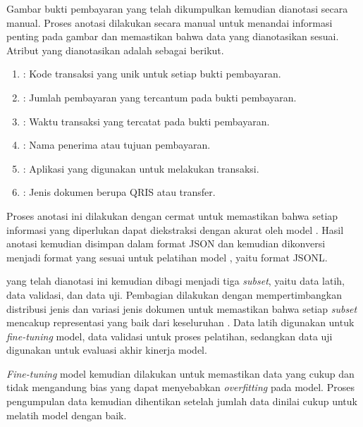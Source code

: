 Gambar bukti pembayaran yang telah dikumpulkan kemudian dianotasi secara manual. Proses anotasi dilakukan secara manual untuk menandai informasi penting pada gambar dan memastikan bahwa data yang dianotasikan sesuai. Atribut yang dianotasikan adalah sebagai berikut.
\begin{enumerate}
    \item \iden{}: Kode transaksi yang unik untuk setiap bukti pembayaran.
    \item \total{}: Jumlah pembayaran yang tercantum pada bukti pembayaran.
    \item \ttime{}: Waktu transaksi yang tercatat pada bukti pembayaran.
    \item \target{}: Nama penerima atau tujuan pembayaran.
    \item \app{}: Aplikasi yang digunakan untuk melakukan transaksi.
    \item \type{}: Jenis dokumen berupa QRIS atau transfer.
\end{enumerate}

Proses anotasi ini dilakukan dengan cermat untuk memastikan bahwa setiap informasi yang diperlukan dapat diekstraksi dengan akurat oleh model \donut{}. Hasil anotasi kemudian disimpan dalam format JSON dan kemudian dikonversi menjadi format yang sesuai untuk pelatihan model \donut{}, yaitu format JSONL. 

\datasetfl{} yang telah dianotasi ini kemudian dibagi menjadi tiga \emph{subset}, yaitu data latih, data validasi, dan data uji. Pembagian dilakukan dengan mempertimbangkan distribusi jenis dan variasi jenis dokumen untuk memastikan bahwa setiap \emph{subset} mencakup representasi yang baik dari keseluruhan \dataset. Data latih digunakan untuk \emph{fine-tuning} model, data validasi untuk proses pelatihan, sedangkan data uji digunakan untuk evaluasi akhir kinerja model. 

\emph{Fine-tuning} model kemudian dilakukan untuk memastikan data yang cukup dan tidak mengandung bias yang dapat menyebabkan \emph{overfitting} pada model. Proses pengumpulan data kemudian dihentikan setelah jumlah data dinilai cukup untuk melatih model \donut{} dengan baik.